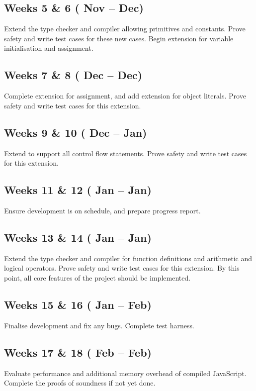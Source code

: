 \documentclass{article}
\begin{document}
		\subsection*{Weeks 5 \& 6 ( Nov --  Dec)}
		Extend the type checker and compiler allowing primitives and constants.
		Prove safety and write test cases for these new cases. Begin extension
		for variable initialisation and assignment.

		\subsection*{Weeks 7 \& 8 ( Dec --  Dec)}
		Complete extension for assignment, and add extension for object
		literals. Prove safety and write test cases for this extension.

		\subsection*{Weeks 9 \& 10 ( Dec --  Jan)}
		Extend to support all control flow statements. Prove safety and write
		test cases for this  extension.

		\subsection*{Weeks 11 \& 12 ( Jan --  Jan)}
		Ensure development is on schedule, and prepare progress report. 

		\subsection*{Weeks 13 \& 14 ( Jan --  Jan)}
		Extend the type checker and compiler for function definitions and
		arithmetic and logical operators. Prove safety and write test cases for
		this extension. By this point, all core features of the project should
		be implemented.

		\subsection*{Weeks 15 \& 16 ( Jan --  Feb)}
		Finalise development and fix any bugs. Complete test harness.

		\subsection*{Weeks 17 \& 18 ( Feb --  Feb)}
		Evaluate performance and additional memory overhead of compiled
		JavaScript. Complete the proofs of soundness if not yet done.
\end{document}
